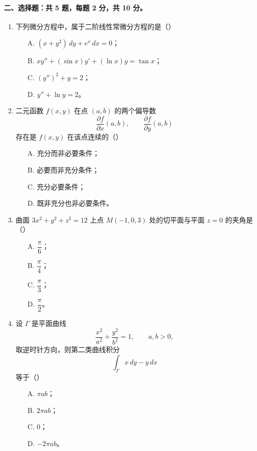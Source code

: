 \paragraph*{二、选择题：共 5 题，每题 2 分，共 10 分。}
\begin{enumerate}
  \item 下列微分方程中，属于二阶线性常微分方程的是（\quad）
  \begin{enumerate}
    \item[A.] $(x+y^2)\,dy+e^x\,dx=0$；
    \item[B.] $xy''+(\sin x)y'+(\ln x)y=\tan x$；
    \item[C.] $(y'')^2+y=2$；
    \item[D.] $y''+\ln y=2$。
  \end{enumerate}

  \item 二元函数 $f(x,y)$ 在点 $(a,b)$ 的两个偏导数
  \[
    \frac{\partial f}{\partial x}(a,b),\qquad
    \frac{\partial f}{\partial y}(a,b)
  \]
  存在是 $f(x,y)$ 在该点连续的（\quad）
  \begin{enumerate}
    \item[A.] 充分而非必要条件；
    \item[B.] 必要而非充分条件；
    \item[C.] 充分必要条件；
    \item[D.] 既非充分也非必要条件。
  \end{enumerate}

  \item 曲面 $3x^2+y^2+z^2=12$ 上点 $M(-1,0,3)$ 处的切平面与平面 $z=0$ 的夹角是（\quad）
  \begin{enumerate}
    \item[A.] $\dfrac{\pi}{6}$；
    \item[B.] $\dfrac{\pi}{4}$；
    \item[C.] $\dfrac{\pi}{3}$；
    \item[D.] $\dfrac{\pi}{2}$。
  \end{enumerate}

  \item 设 $\Gamma$ 是平面曲线
  \[
    \frac{x^2}{a^2}+\frac{y^2}{b^2}=1,\qquad a,b>0,
  \]
  取逆时针方向，则第二类曲线积分
  \[
    \int_\Gamma x\,dy-y\,dx
  \]
  等于（\quad）
  \begin{enumerate}
    \item[A.] $\pi ab$；
    \item[B.] $2\pi ab$；
    \item[C.] $0$；
    \item[D.] $-2\pi ab$。
  \end{enumerate}


\end{enumerate}
